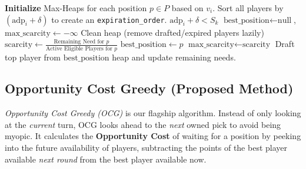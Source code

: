 \documentclass[11pt,a4paper]{article}
\begin{document}
\begin{algorithm}[H]
\caption{Direct Greedy (DG)}
\begin{algorithmic}[1]
\State \textbf{Initialize} Max-Heaps for each position $p \in P$ based on $v_i$.
\State Sort all players by $(\text{adp}_i + \delta)$ to create an \texttt{expiration\_order}.
    \State {} $\text{adp}_i + \delta < S_k$
    \State $\text{best\_position} \leftarrow \text{null}$, $\text{max\_scarcity} \leftarrow -\infty$
        \State Clean heap (remove drafted/expired players lazily)
        \State $\text{scarcity} \leftarrow \frac{\text{Remaining Need for } p}{\text{Active Eligible Players for } p}$
            \State $\text{best\_position} \leftarrow p$
            \State $\text{max\_scarcity} \leftarrow \text{scarcity}$
        \EndIf
    \EndFor
    \State Draft top player from $\text{best\_position}$ heap and update remaining needs.
\EndFor
\end{algorithmic}
\end{algorithm}

\subsection{Opportunity Cost Greedy (Proposed Method)}
\emph{Opportunity Cost Greedy (OCG)} is our flagship algorithm. Instead of only looking at the \textit{current} turn, OCG looks ahead to the \textit{next} owned pick to avoid being myopic. It calculates the \textbf{Opportunity Cost} of waiting for a position by peeking into the future availability of players, subtracting the points of the best player available \textit{next round} from the best player available now.
\end{document}
